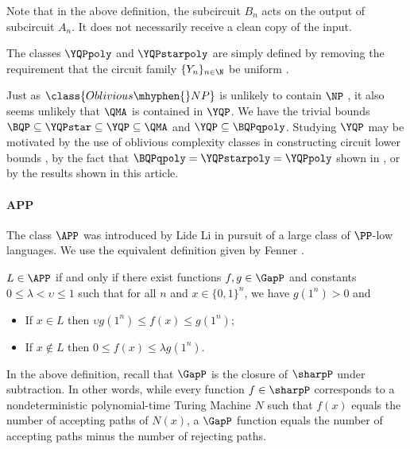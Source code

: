\documentclass{toc}
\begin{document}
Note that in the above definition, the subcircuit $B_n$ acts on the output of subcircuit $A_n$.
It does not necessarily receive a clean copy of the input.

%
The classes $\YQPpoly$ and $\YQPstarpoly$ 
are simply defined
by removing the requirement that the circuit family $\{Y_n\}_{n\in \N}$ be uniform \cite{aaronson2014full}.
%

Just as $\class{Oblivious\mhyphen{}NP}$ is unlikely to contain $\NP$ \cite{fortnow2009fixed},
it also seems unlikely that $\QMA$ is contained in $\YQP$.
We have the trivial bounds $\BQP\subseteq \YQPstar \subseteq \YQP\subseteq \QMA$
and $\YQP\subseteq \BQPqpoly$.
Studying $\YQP$ may be motivated by the use of oblivious complexity classes
in constructing circuit lower bounds \cite{fortnow2009fixed,chakaravarthy2006oblivious,GLV24oblivious},
by the fact that $\BQPqpoly = \YQPstarpoly = \YQPpoly$ shown %
in \cite{aaronson2014full}, %
or by the results shown in this %
article.  %

\paragraph{\texorpdfstring{$\mathsf{\mathbf{APP}}$}{APP}}
The class $\APP$ was introduced by
Lide %
%
Li \cite{li1993counting} in pursuit of
a large class of $\PP$-low languages.
We use the equivalent definition given by Fenner \cite[Corollary 3.7]{fenner2003pp}.

\begin{definition}\label{def:APP}
	$L\in \APP$ if and only if there exist
	functions $f,g\in \GapP$ and constants $0\leq \lambda < \upsilon \leq 1$ such that
	for all $n$ and $x\in\{0,1\}^n$,
	we have $g(1^n)>0$ and
	\begin{itemize}
		\item If $x\in L$ then
		$\upsilon g(1^n) \leq f(x) \leq g(1^n)$;
		\item If $x\notin L$ then $0\leq f(x) \leq \lambda g(1^n)$.
	\end{itemize}
\end{definition}

In the above definition, recall that $\GapP$ is the closure of $\sharpP$ under
subtraction.
In other words, while every function $f\in \sharpP$ corresponds to a nondeterministic
polynomial-time Turing Machine $N$ such that $f(x)$ equals the number of accepting paths
of $N(x)$,
a $\GapP$ function equals the number of accepting paths minus the number
of rejecting paths.
\end{document}
